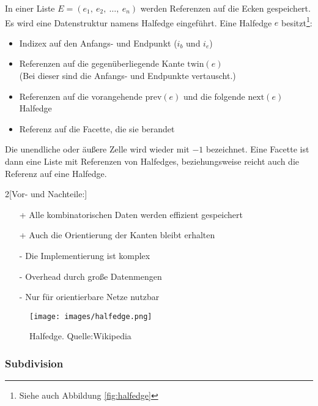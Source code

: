 \begin{Definition}[Halfedge]

In einer Liste $E = (e_1,~e_2,~\hdots,~e_n)$ werden Referenzen auf die Ecken 
gespeichert. 
Es wird eine Datenstruktur namens Halfedge eingeführt. 
Eine Halfedge $e$ besitzt\footnote{Siehe auch Abbildung \vref{fig:halfedge}}: 
\begin{itemize}
    \item Indizex auf den Anfangs- und Endpunkt ($i_b$ und $i_e$)
    \item Referenzen auf die gegenüberliegende Kante $\textrm{twin}(e)$\\
          (Bei dieser sind die Anfangs- und Endpunkte vertauscht.)
    \item Referenzen auf die vorangehende $\textrm{prev}(e)$ und die folgende 
          $\textrm{next}(e)$ Halfedge
    \item Referenz auf die Facette, die sie berandet
\end{itemize}
Die unendliche oder äußere Zelle wird wieder mit $-1$ bezeichnet. 
Eine Facette ist dann eine Liste mit Referenzen von Halfedges, beziehungsweise 
reicht auch die Referenz auf eine Halfedge.

\end{Definition}
\begin{multicols}{2}[Vor- und Nachteile:]
    \begin{itemize}
        \item[+] Alle kombinatorischen Daten werden effizient gespeichert
        \item[+] Auch die Orientierung der Kanten bleibt erhalten
        \vspace{10pt}
        \item[-] Die Implementierung ist komplex
        \item[-] Overhead durch große Datenmengen
        \item[-] Nur für orientierbare Netze nutzbar
    \end{itemize}
\end{multicols}

\begin{figure}[H]
    \centering 
    \texttt{[image: images/halfedge.png]}
    \caption{Halfedge. Quelle:Wikipedia}
    \label{fig:halfedge}
\end{figure}

\subsubsection{Subdivision}



